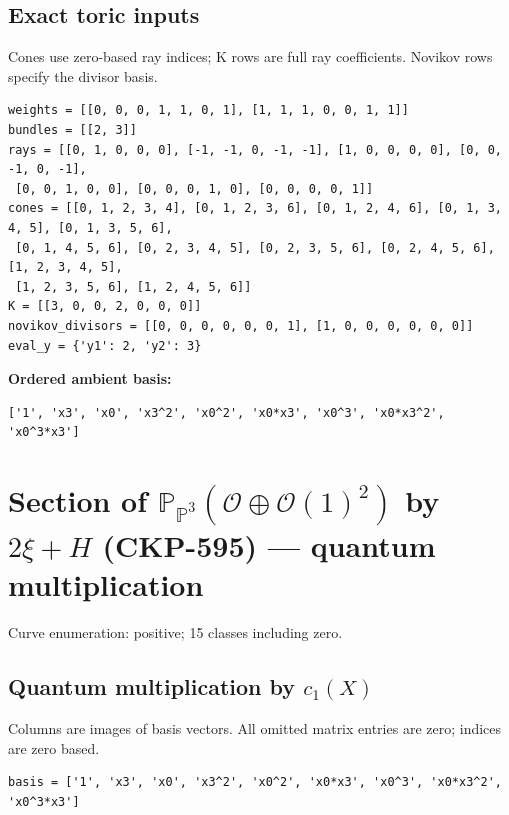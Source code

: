 \documentclass[10pt,a4paper]{article}
\begin{document}
\subsection*{Exact toric inputs}
Cones use zero-based ray indices; K rows are full ray coefficients. Novikov rows specify the divisor basis.

\begin{lstlisting}
weights = [[0, 0, 0, 1, 1, 0, 1], [1, 1, 1, 0, 0, 1, 1]]
bundles = [[2, 3]]
rays = [[0, 1, 0, 0, 0], [-1, -1, 0, -1, -1], [1, 0, 0, 0, 0], [0, 0, -1, 0, -1],
 [0, 0, 1, 0, 0], [0, 0, 0, 1, 0], [0, 0, 0, 0, 1]]
cones = [[0, 1, 2, 3, 4], [0, 1, 2, 3, 6], [0, 1, 2, 4, 6], [0, 1, 3, 4, 5], [0, 1, 3, 5, 6],
 [0, 1, 4, 5, 6], [0, 2, 3, 4, 5], [0, 2, 3, 5, 6], [0, 2, 4, 5, 6], [1, 2, 3, 4, 5],
 [1, 2, 3, 5, 6], [1, 2, 4, 5, 6]]
K = [[3, 0, 0, 2, 0, 0, 0]]
novikov_divisors = [[0, 0, 0, 0, 0, 0, 1], [1, 0, 0, 0, 0, 0, 0]]
eval_y = {'y1': 2, 'y2': 3}
\end{lstlisting}

\textbf{Ordered ambient basis:}
\begin{lstlisting}
['1', 'x3', 'x0', 'x3^2', 'x0^2', 'x0*x3', 'x0^3', 'x0*x3^2', 'x0^3*x3']
\end{lstlisting}

\clearpage\section*{Section of $\mathbb P_{\mathbb P^{3}}(\mathcal O\oplus \mathcal O(1)^{2})$ by $2\xi +H$ (CKP-595) --- quantum multiplication}

Curve enumeration: positive; 15 classes including zero.
\subsection*{Quantum multiplication by $c_1(X)$}
Columns are images of basis vectors. All omitted matrix entries are zero; indices are zero based.

\begin{lstlisting}
basis = ['1', 'x3', 'x0', 'x3^2', 'x0^2', 'x0*x3', 'x0^3', 'x0*x3^2', 'x0^3*x3']
\end{lstlisting}
\end{document}
